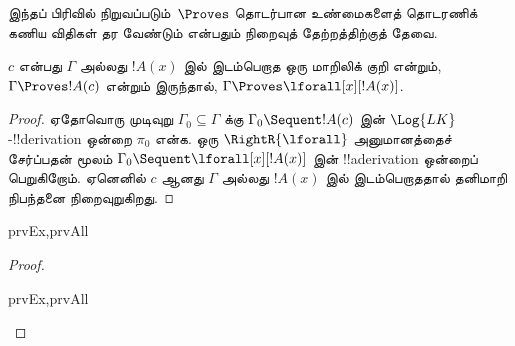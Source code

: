 \documentclass[../../../include/open-logic-section]{subfiles}
\begin{document}

\begin{explain}
  இந்தப் பிரிவில் நிறுவப்படும்~$\Proves$ தொடர்பான உண்மைகளைத் தொடரணிக் கணிய
  விதிகள் தர வேண்டும் என்பதும் நிறைவுத் தேற்றத்திற்குத் தேவை.
\end{explain}

\begin{thm}
 $c$ என்பது $\Gamma$ அல்லது $!A(x)$ இல்
இடம்பெறாத ஒரு மாறிலிக் குறி என்றும், $\Gamma \Proves !A(c)$ என்றும் இருந்தால்,
$\Gamma \Proves \lforall[x][!A(x)]$.
\end{thm}

\begin{proof}
ஏதோவொரு முடிவுறு $\Gamma_0 \subseteq \Gamma$ க்கு $\Gamma_0 \Sequent
!A(c)$ இன் $\Log{LK}$-!!{derivation} ஒன்றை $\pi_0$ என்க. ஒரு
$\RightR{\lforall}$ அனுமானத்தைச் சேர்ப்பதன் மூலம் $\Gamma_0 \Sequent
\lforall[x][!A(x)]$ இன் !!a{derivation} ஒன்றைப் பெறுகிறோம். ஏனெனில் $c$ ஆனது
$\Gamma$ அல்லது $!A(x)$ இல் இடம்பெறாததால் தனிமாறி நிபந்தனை நிறைவுறுகிறது.
\end{proof}

\begin{prop}
\begin{tagenumerate}{prvEx,prvAll}
\end{tagenumerate}
\end{prop}

\begin{proof}
\begin{tagenumerate}{prvEx,prvAll}
\end{tagenumerate}
\end{proof}
\end{document}
